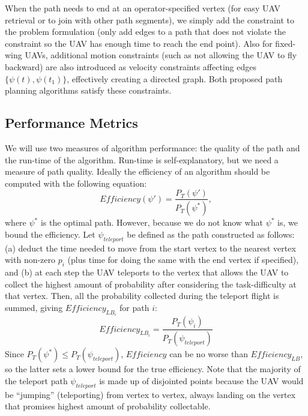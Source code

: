 When the path needs to end at an operator-specified vertex (for easy UAV retrieval or to join with other path segments), we simply add the constraint to the problem formulation (only add edges to a path that does not violate the constraint so the UAV has enough time to reach the end point). Also for fixed-wing UAVs, additional motion constraints (such as not allowing the UAV to fly backward) are also introduced as velocity constraints affecting edges $\{\psi(t), \psi(t_1)\}$, effectively creating a directed graph. Both proposed path planning algorithms satisfy these constraints.

\subsection{Performance Metrics}

We will use two measures of algorithm performance: the quality of the path and the run-time of the algorithm. Run-time is self-explanatory, but we need a measure of path quality. Ideally the efficiency of an algorithm should be computed with the following equation:
\begin{equation}
\mathit{Efficiency}(\psi') = \frac{P_T(\psi')}{P_T(\psi^*)},
\label{Efficiency}
\end{equation}
where $\psi^*$ is the optimal path. However, because we do not know what $\psi^*$ is, we bound the efficiency. Let $\psi_{teleport}$ be defined as the path constructed as follows: (a) deduct the time needed to move from the start vertex to the nearest vertex with non-zero $p_i$ (plus time for doing the same with the end vertex if specified), and (b) at each step the UAV teleports to the vertex that allows the UAV to collect the highest amount of probability after considering the task-difficulty at that vertex. Then, all the probability collected during the teleport flight is summed, giving $\mathit{Efficiency_{LB_i}}$ for path $i$:
\begin{equation}
\mathit{Efficiency_{LB_i}} = \frac{P_T(\psi_i)}{P_T(\psi_{teleport})}
\label{EfficiencyLB}
\end{equation}
Since $P_T(\psi^*) \leq P_T(\psi_{teleport})$, $\mathit{Efficiency}$ can be no worse than $\mathit{Efficiency_{LB}}$, so the latter sets a lower bound for the true efficiency. Note that the majority of the teleport path $\psi_{teleport}$ is made up of disjointed points because the UAV would be ``jumping'' (teleporting) from vertex to vertex, always landing on the vertex that promises highest amount of probability collectable.

